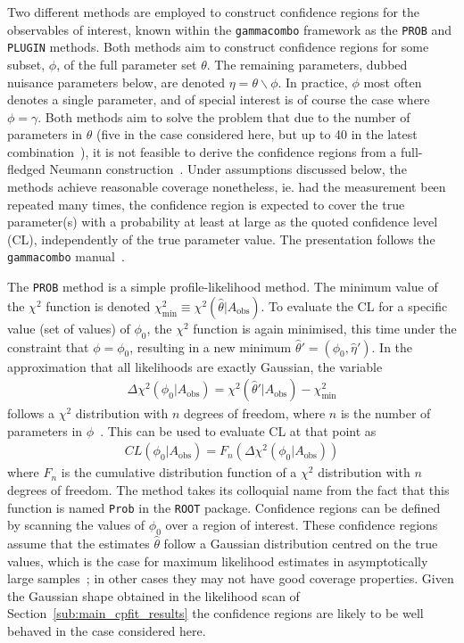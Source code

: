 Two different methods are employed to construct confidence regions for the observables of interest, known within the \texttt{gammacombo} framework as the \texttt{PROB} and \texttt{PLUGIN} methods. Both methods aim to construct confidence regions for some subset, $\phi$, of the full parameter set $\theta$. The remaining parameters, dubbed nuisance parameters below, are denoted $\eta = \theta \backslash \phi$. In practice, $\phi$ most often denotes a single parameter, and of special interest is of course the case where $\phi = \gamma$. Both methods aim to solve the problem that due to the number of parameters in $\theta$ (five in the case considered here, but up to 40 in the latest \lhcb combination~\cite{LHCb-CONF-2018-002}), it is not feasible to derive the confidence regions from a full-fledged Neumann construction~\cite{neumannOutlineTheoryStatistical1937}. Under assumptions discussed below, the methods achieve reasonable coverage nonetheless, ie. had the measurement been repeated many times, the confidence region is expected to cover the true parameter(s) with a probability at least at large as the quoted confidence level (CL), independently of the true parameter value. The presentation follows the \texttt{gammacombo} manual~\cite{gammacombo}. 

The \texttt{PROB} method is a simple profile-likelihood method. The minimum value of the $\chi^2$ function is denoted $\chi^2_\mathrm{min}\equiv\chi^2(\hat \theta|A_\mathrm{obs})$.  To evaluate the CL for a specific value (set of values) of $\phi_0$, the $\chi^2$ function is again minimised, this time under the constraint that $\phi=\phi_0$, resulting in a new minimum $\hat \theta' = (\phi_0, \hat \eta')$. In the approximation that all likelihoods are exactly Gaussian, the variable
\begin{align}
    \Delta \chi^2(\phi_0|A_\mathrm{obs}) = \chi^2(\hat \theta '|A_\mathrm{obs}) - \chi^2_\mathrm{min}
\end{align}
follows a $\chi^2$ distribution with $n$ degrees of freedom, where $n$ is the number of parameters in $\phi$~\cite{PDG2020}. This can be used to evaluate CL at that point as
\begin{align}
    CL(\phi_0|A_\mathrm{obs}) = F_n(\Delta \chi^2(\phi_0|A_\mathrm{obs}))
\end{align}
where $F_n$ is the cumulative distribution function of a $\chi^2$ distribution with $n$ degrees of freedom. The method takes its colloquial name from the fact that this function is named \texttt{Prob} in the \texttt{ROOT} package. Confidence regions can be defined by scanning the values of $\phi_0$ over a region of interest. These confidence regions assume that the estimates $\hat \theta$ follow a Gaussian distribution centred on the true values, which is  the case for maximum likelihood estimates in asymptotically large samples~\cite{lehmannElementsLargeSampleTheory1998}; in other cases they may not have good coverage properties. Given the Gaussian shape obtained in the likelihood scan of Section~\ref{sub:main_cpfit_results} the confidence regions are likely to be well behaved in the case considered here.

